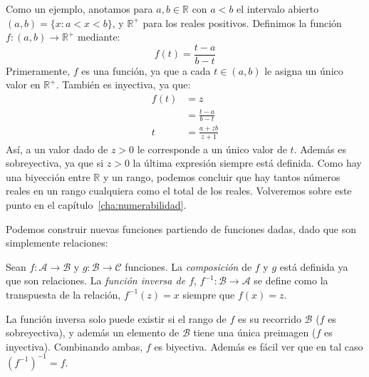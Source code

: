  Como un ejemplo,
  anotamos para \(a, b \in \mathbb{R}\) con \(a < b\)
  el intervalo abierto \((a, b) = \{x \colon a < x < b\}\),
  y \(\mathbb{R}^+\) para los reales positivos.
  Definimos la función \(f \colon (a, b) \rightarrow \mathbb{R}^+\) mediante:
  \begin{equation*}
    f(t)
      = \frac{t - a}{b - t}
  \end{equation*}
  Primeramente,
  \(f\) es una función,
  ya que a cada \(t \in (a, b)\)
  le asigna un único valor en \(\mathbb{R}^+\).
  También es inyectiva,
  ya que:
  \begin{align*}
    f(t)
      &= z \\
      &= \frac{t - a}{b - t} \\
    t
      &= \frac{a + z b}{z + 1}
  \end{align*}
  Así,
  a un valor dado de \(z > 0\) le corresponde a un único valor de \(t\).
  Además es sobreyectiva,
  ya que si \(z > 0\)
  la última expresión siempre está definida.
  Como hay una biyección entre \(\mathbb{R}\) y un rango,
  podemos concluir que hay tantos números reales en un rango cualquiera
  como el total de los reales.
  Volveremos sobre este punto en el capítulo~\ref{cha:numerabilidad}.

  Podemos construir nuevas funciones partiendo de funciones dadas,
  dado que son simplemente relaciones:
  \begin{definition}
    Sean \(f \colon \mathcal{A} \rightarrow \mathcal{B}\)
    y \(g \colon \mathcal{B} \rightarrow \mathcal{C}\) funciones.
    La \emph{composición} de \(f\) y \(g\) está definida
    ya que son relaciones.
    La \emph{función inversa de \(f\)},
    \(f^{-1} \colon \mathcal{B} \rightarrow \mathcal{A}\)%
    se define como la transpuesta de la relación,
    \(f^{-1}(z) = x\) siempre que \(f(x) = z\).
  \end{definition}
  La función inversa solo puede existir
  si el rango de \(f\) es su recorrido \(\mathcal{B}\)
  (\(f\) es sobreyectiva),
  y además un elemento de \(\mathcal{B}\) tiene una única preimagen
  (\(f\) es inyectiva).
  Combinando ambas,
  \(f\) es biyectiva.
  Además es fácil ver que en tal caso \((f^{-1})^{-1} = f\).

